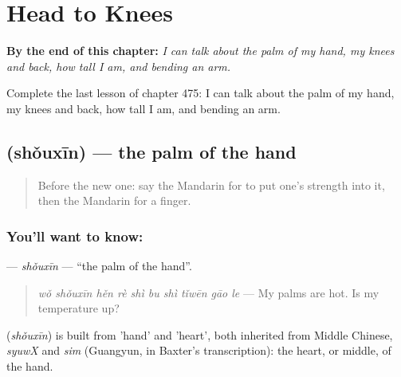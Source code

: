 
\chapter{Head to Knees}
\label{ch:zh-head-to-knees}

\begin{chapteropening}
\textbf{By the end of this chapter:} \emph{I can talk about the palm of my hand, my knees and back, how tall I am, and bending an arm.}

Complete the last lesson of chapter 475: I can talk about the palm of my hand, my knees and back, how tall I am, and bending an arm.
\end{chapteropening}

\section[\texorpdfstring{\zh{手心} (shǒuxīn)}{手心 (shǒuxīn)}]{ (shǒuxīn) — the palm of the hand}

\label{lesson:ZH-C475-shouxin}



\begin{quote}
Before the new one: say the Mandarin for to put one's strength into it, then the Mandarin for a finger.
\end{quote}

\subsection*{You'll want to know: }
\textbf{} — \emph{shǒuxīn} — \textquotedblleft{}the palm of the hand\textquotedblright{}.

\begin{quote}
\textbf{} \emph{wǒ shǒuxīn hěn rè shì bu shì tǐwēn gāo le} — My palms are hot. Is my temperature up?
\end{quote}

\begin{cousinweb}
\textbf{} (\emph{shǒuxīn}) is built from  'hand' and  'heart', both inherited from Middle Chinese, \emph{syuwX} and \emph{sim} (Guangyun, in Baxter's transcription): the heart, or middle, of the hand.
\end{cousinweb}

